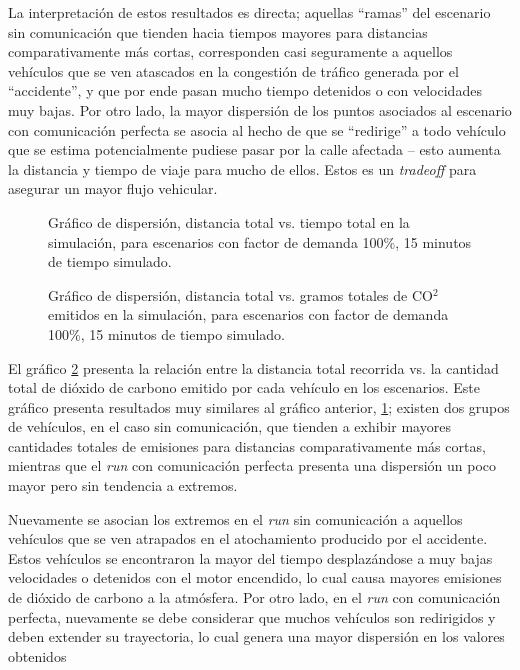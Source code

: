 La interpretación de estos resultados es directa; aquellas ``ramas'' del escenario sin comunicación que tienden hacia tiempos mayores para distancias comparativamente más cortas, corresponden casi seguramente a aquellos vehículos que se ven atascados en la congestión de tráfico generada por el ``accidente'', y que por ende pasan mucho tiempo detenidos o con velocidades muy bajas. Por otro lado, la mayor dispersión de los puntos asociados al escenario con comunicación perfecta se asocia al hecho de que se ``redirige'' a todo vehículo que se estima potencialmente pudiese pasar por la calle afectada -- esto aumenta la distancia y tiempo de viaje para mucho de ellos. Estos es un \emph{tradeoff} para asegurar un mayor flujo vehicular.

\begin{figure}[tpb]
    \centering
    
    \caption[Distancia vs. tiempo total]{Gráfico de dispersión, distancia total vs. tiempo total en la simulación, para escenarios con factor de demanda 100\%, 15 minutos de tiempo simulado.}
    \label{fig:distvstime}
\end{figure}

\begin{figure}[tpb]
    \centering
    
    \caption[Distancia vs. CO$^{2}$ total]{Gráfico de dispersión, distancia total vs. gramos totales de CO$^{2}$ emitidos en la simulación, para escenarios con factor de demanda 100\%, 15 minutos de tiempo simulado.}
    \label{fig:distvsco2}
\end{figure}

El gráfico \ref{fig:distvsco2} presenta la relación entre la distancia total recorrida vs. la cantidad total de dióxido de carbono emitido por cada vehículo en los escenarios. Este gráfico presenta resultados muy similares al gráfico anterior, \ref{fig:distvstime}; existen dos grupos de vehículos, en el caso sin comunicación, que tienden a exhibir mayores cantidades totales de emisiones para distancias comparativamente más cortas, mientras que el \emph{run} con comunicación perfecta presenta una dispersión un poco mayor pero sin tendencia a extremos.

Nuevamente se asocian los extremos en el \emph{run} sin comunicación a aquellos vehículos que se ven atrapados en el atochamiento producido por el accidente. Estos vehículos se encontraron la mayor del tiempo desplazándose a muy bajas velocidades o detenidos con el motor encendido, lo cual causa mayores emisiones de dióxido de carbono a la atmósfera. Por otro lado, en el \emph{run} con comunicación perfecta, nuevamente se debe considerar que muchos vehículos son redirigidos y deben extender su trayectoria, lo cual genera una mayor dispersión en los valores obtenidos




